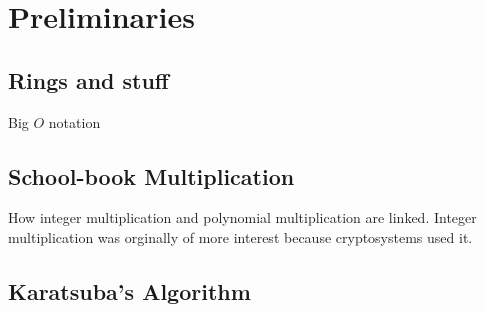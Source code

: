\chapter{Preliminaries}\label{preliminaries}

\section{Rings and stuff}
\label{sec:prelim-rings}

Big $O$ notation 
\section{School-book Multiplication}
\label{sec:prelim-schoolbook}

How integer multiplication and polynomial multiplication are linked. Integer multiplication was orginally of more interest because cryptosystems used it.

\section{Karatsuba's Algorithm}
\label{sec:prelim-karatsuba}



